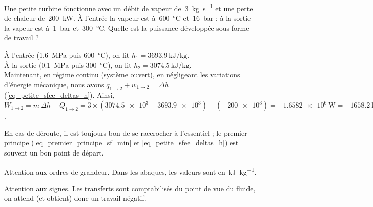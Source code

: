 			\begin{anexample}
			Une petite turbine fonctionne avec un débit de vapeur de~\SI{3}{\kilogram\per\second} et une perte de chaleur de~\SI{200}{\kilo\watt}. À l’entrée la vapeur est à~\SI{600}{\degreeCelsius} et~\SI{16}{\bar} ; à la sortie la vapeur est à~\SI{1}{\bar} et~\SI{300}{\degreeCelsius}. Quelle est la puissance développée sous forme de travail ?
		
				\begin{answer}À l’entrée (\SI{1,6}{\mega\pascal} puis \SI{600}{\degreeCelsius}), on lit $h_1 = \SI{3693,9}{\kilo\joule\per\kilogram}$.\\
					À la sortie (\SI{0,1}{\mega\pascal} puis \SI{300}{\degreeCelsius}), on lit $h_2 = \SI{3074,5}{\kilo\joule\per\kilogram}$.\\
					Maintenant, en régime continu (système ouvert), en négligeant les variations d’énergie mécanique, nous avons $q_{1 \to 2} + w_{1 \to 2} = \Delta h$ (\ref{eq_petite_sfee_deltas_h}). Ainsi, $\dot W_{1 \to 2} = \dot m \ \Delta h - \dot Q_{1 \to 2} = 3 \times (\num{3074,5e3}-\num{3693,9e3}) - (\num{-200e3}) = \SI{-1,6582e6}{\watt} = \SI{-1658,2}{\kilo\watt} $.
							
					\begin{remark}En cas de déroute, il est toujours bon de se raccrocher à l’essentiel ; le premier principe (\ref{eq_premier_principe_sf_min} et \ref{eq_petite_sfee_deltas_h}) est souvent un bon point de départ. \end{remark}
					\begin{remark}Attention aux ordres de grandeur. Dans les abaques, les valeurs sont en~\si{\kilo\joule\per\kilogram}.\end{remark}
					\begin{remark}Attention aux signes. Les transferts sont comptabilisés du point de vue du fluide, on attend (et obtient) donc un travail négatif.\end{remark}
				\end{answer}
			\end{anexample}

